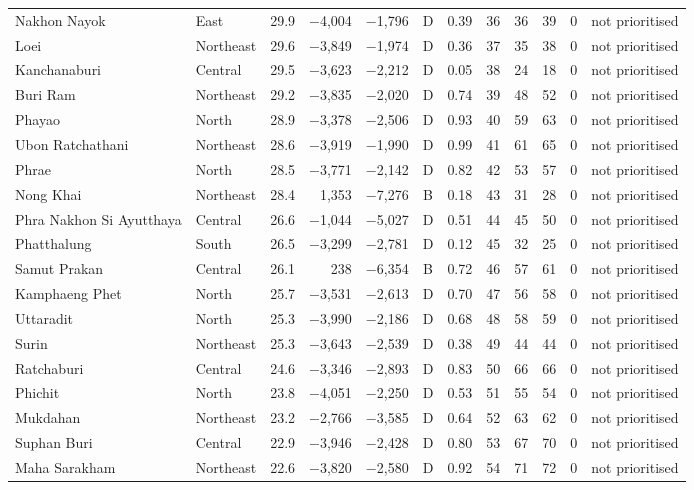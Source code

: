 \begin{longtable}{llrrrcrrrrrl}
Nakhon Nayok & East & 29.9 & $-$4,004 & $-$1,796 & D & 0.39 & 36 & 36 & 39 & 0 & not prioritised \\
Loei & Northeast & 29.6 & $-$3,849 & $-$1,974 & D & 0.36 & 37 & 35 & 38 & 0 & not prioritised \\
Kanchanaburi & Central & 29.5 & $-$3,623 & $-$2,212 & D & 0.05 & 38 & 24 & 18 & 0 & not prioritised \\
Buri Ram & Northeast & 29.2 & $-$3,835 & $-$2,020 & D & 0.74 & 39 & 48 & 52 & 0 & not prioritised \\
Phayao & North & 28.9 & $-$3,378 & $-$2,506 & D & 0.93 & 40 & 59 & 63 & 0 & not prioritised \\
Ubon Ratchathani & Northeast & 28.6 & $-$3,919 & $-$1,990 & D & 0.99 & 41 & 61 & 65 & 0 & not prioritised \\
Phrae & North & 28.5 & $-$3,771 & $-$2,142 & D & 0.82 & 42 & 53 & 57 & 0 & not prioritised \\
Nong Khai & Northeast & 28.4 & 1,353 & $-$7,276 & B & 0.18 & 43 & 31 & 28 & 0 & not prioritised \\
Phra Nakhon Si Ayutthaya & Central & 26.6 & $-$1,044 & $-$5,027 & D & 0.51 & 44 & 45 & 50 & 0 & not prioritised \\
Phatthalung & South & 26.5 & $-$3,299 & $-$2,781 & D & 0.12 & 45 & 32 & 25 & 0 & not prioritised \\
Samut Prakan & Central & 26.1 & 238 & $-$6,354 & B & 0.72 & 46 & 57 & 61 & 0 & not prioritised \\
Kamphaeng Phet & North & 25.7 & $-$3,531 & $-$2,613 & D & 0.70 & 47 & 56 & 58 & 0 & not prioritised \\
Uttaradit & North & 25.3 & $-$3,990 & $-$2,186 & D & 0.68 & 48 & 58 & 59 & 0 & not prioritised \\
Surin & Northeast & 25.3 & $-$3,643 & $-$2,539 & D & 0.38 & 49 & 44 & 44 & 0 & not prioritised \\
Ratchaburi & Central & 24.6 & $-$3,346 & $-$2,893 & D & 0.83 & 50 & 66 & 66 & 0 & not prioritised \\
Phichit & North & 23.8 & $-$4,051 & $-$2,250 & D & 0.53 & 51 & 55 & 54 & 0 & not prioritised \\
Mukdahan & Northeast & 23.2 & $-$2,766 & $-$3,585 & D & 0.64 & 52 & 63 & 62 & 0 & not prioritised \\
Suphan Buri & Central & 22.9 & $-$3,946 & $-$2,428 & D & 0.80 & 53 & 67 & 70 & 0 & not prioritised \\
Maha Sarakham & Northeast & 22.6 & $-$3,820 & $-$2,580 & D & 0.92 & 54 & 71 & 72 & 0 & not prioritised \\

\end{longtable}
